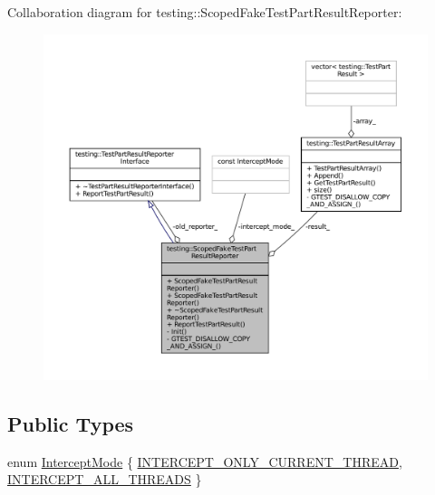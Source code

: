 Collaboration diagram for testing\+:\+:Scoped\+Fake\+Test\+Part\+Result\+Reporter\+:
\nopagebreak
\begin{figure}[H]
\begin{center}
\leavevmode
\includegraphics[width=350pt]{classtesting_1_1ScopedFakeTestPartResultReporter__coll__graph}
\end{center}
\end{figure}
\subsection*{Public Types}
\begin{DoxyCompactItemize}
\item 
enum \hyperlink{classtesting_1_1ScopedFakeTestPartResultReporter_a82f6209b3cf5c4b15ec8bd8041dbc2d5}{Intercept\+Mode} \{ \hyperlink{classtesting_1_1ScopedFakeTestPartResultReporter_a82f6209b3cf5c4b15ec8bd8041dbc2d5aed6c5f87d33207768db503526e6a1e8a}{I\+N\+T\+E\+R\+C\+E\+P\+T\+\_\+\+O\+N\+L\+Y\+\_\+\+C\+U\+R\+R\+E\+N\+T\+\_\+\+T\+H\+R\+E\+AD}, 
\hyperlink{classtesting_1_1ScopedFakeTestPartResultReporter_a82f6209b3cf5c4b15ec8bd8041dbc2d5a187f4164aad7fbb9414b263c68a693cd}{I\+N\+T\+E\+R\+C\+E\+P\+T\+\_\+\+A\+L\+L\+\_\+\+T\+H\+R\+E\+A\+DS}
 \}
\end{DoxyCompactItemize}
